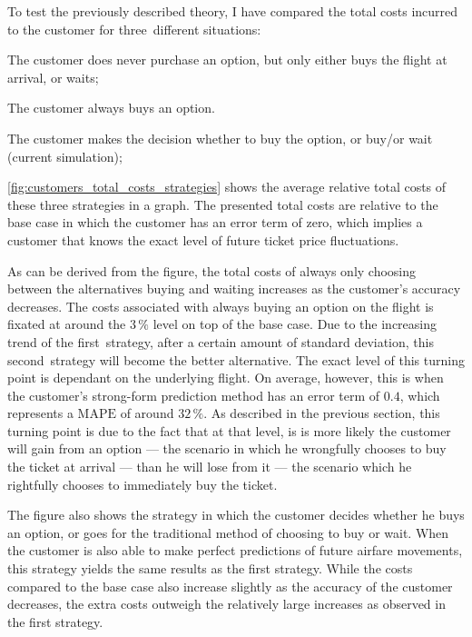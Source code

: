To test the previously described theory, I have compared the total costs incurred to the customer for three~different situations:
\begin{compactitem}
    \item The customer does never purchase an option, but only either buys the flight at arrival, or waits;
    \item The customer always buys an option.
    \item The customer makes the decision whether to buy the option, or buy/or wait (current simulation);
\end{compactitem}

\autoref{fig:customers_total_costs_strategies} shows the average relative total costs of these three strategies in a graph. The presented total costs are relative to the base case in which the customer has an error term of zero, which implies a customer that knows the exact level of future ticket price fluctuations.

As can be derived from the figure, the total costs of always only choosing between the alternatives buying and waiting increases as the customer's accuracy decreases. The costs associated with always buying an option on the flight is fixated at around the $3\,\%$ level on top of the base case. Due to the increasing trend of the first~strategy, after a certain amount of standard deviation, this second~strategy will become the better alternative. The exact level of this turning point is dependant on the underlying flight. On average, however, this is when the customer's strong-form prediction method has an error term of $0.4$, which represents a $\mbox{MAPE}$ of around $32\,\%$. As described in the previous section, this turning point is due to the fact that at that level, is is more likely the customer will gain from an option --- the scenario in which he wrongfully chooses to buy the ticket at arrival --- than he will lose from it --- the scenario which he rightfully chooses to immediately buy the ticket.


The figure also shows the strategy in which the customer decides whether he buys an option, or goes for the traditional method of choosing to buy or wait. When the customer is also able to make perfect predictions of future airfare movements, this strategy yields the same results as the first strategy. While the costs compared to the base case also increase slightly as the accuracy of the customer decreases, the extra costs outweigh the relatively large increases as observed in the first strategy.

